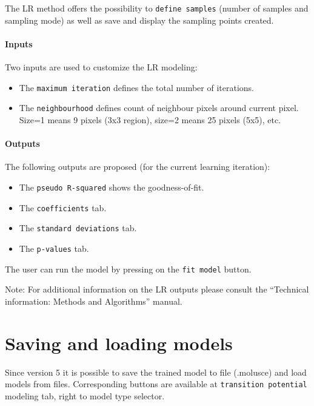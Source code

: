 \documentclass{report}
\begin{document}
The LR method offers the possibility to \verb+define samples+ (number of samples and sampling mode) as
well as save and display the sampling points created.

\paragraph{Inputs} Two inputs are used to customize the LR modeling:
\begin{itemize}
  \item The \verb+maximum iteration+ defines the total number of iterations.
  \item The \verb+neighbourhood+ defines count of neighbour pixels around current pixel. Size=1 means 9
pixels (3x3 region), size=2 means 25 pixels (5x5), etc.
\end{itemize}

\paragraph{Outputs} 

The following outputs are proposed (for the current learning iteration):

\begin{itemize}
  \item The \verb+pseudo R-squared+ shows the goodness-of-fit.
  \item The \verb+coefficients+ tab.
  \item The \verb+standard deviations+ tab.
  \item The \verb+p-values+ tab.
\end{itemize}

The user can run the model by pressing on the \verb+fit model+ button.

Note: For additional information on the LR outputs please consult the “Technical information:
Methods and Algorithms” manual.

\section{Saving and loading models}

Since version 5 it is possible to save the trained model to file (.molusce) and load models from files. Corresponding buttons are available at \verb+transition potential+ modeling tab, right to model type selector.
\end{document}
